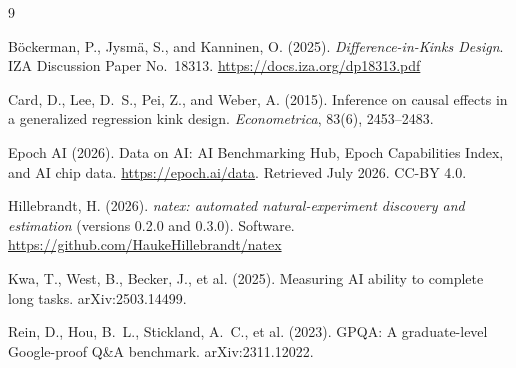 \documentclass[11pt]{article}
\begin{document}
\begin{thebibliography}{9}

B\"ockerman, P., Jysm\"a, S., and Kanninen, O. (2025).
\emph{Difference-in-Kinks Design}.
IZA Discussion Paper No.~18313.
\url{https://docs.iza.org/dp18313.pdf}

Card, D., Lee, D.~S., Pei, Z., and Weber, A. (2015).
Inference on causal effects in a generalized regression kink design.
\emph{Econometrica}, 83(6), 2453--2483.

Epoch AI (2026).
Data on AI: AI Benchmarking Hub, Epoch Capabilities Index, and AI chip data.
\url{https://epoch.ai/data}. Retrieved July 2026. CC-BY 4.0.

Hillebrandt, H. (2026).
\emph{natex: automated natural-experiment discovery and estimation} (versions 0.2.0
and 0.3.0). Software.
\url{https://github.com/HaukeHillebrandt/natex}

Kwa, T., West, B., Becker, J., et al. (2025).
Measuring AI ability to complete long tasks.
arXiv:2503.14499.

Rein, D., Hou, B.~L., Stickland, A.~C., et al. (2023).
GPQA: A graduate-level Google-proof Q\&A benchmark.
arXiv:2311.12022.

\end{thebibliography}
\end{document}
